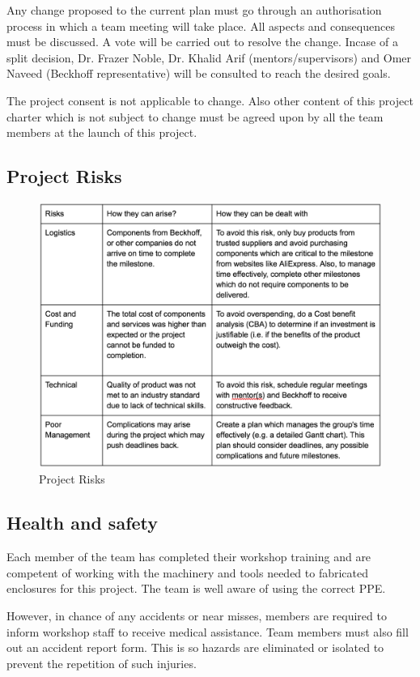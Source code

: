 \documentclass[a4paper, 10pt, conference]{IEEEconf}
\begin{document}
Any change proposed to the current plan must go through an authorisation process in which a team meeting will take place. All aspects and consequences must be discussed. A vote will be carried out to resolve the change. Incase of a split decision, Dr. Frazer Noble, Dr. Khalid Arif (mentors/supervisors) and Omer Naveed (Beckhoff representative) will be consulted to reach the desired goals.

The project consent is not applicable to change. Also other content of this project charter which is not subject to change must be agreed upon by all the team members at the launch of this project. 

\subsection{Project Risks}

\begin{figure}[h!]
  \includegraphics[width=\linewidth]{images/Management}
  \caption{Project Risks}
  \label{fig:ProjectRisks}
\end{figure}

\subsection{Health and safety}
Each member of the team has completed their workshop training and are competent of working with the machinery and tools needed to fabricated enclosures for this project. The team is well aware of using the correct PPE.

However, in chance of any accidents or near misses, members are required to inform workshop staff to receive medical assistance. Team members must also fill out an accident report form. This is so hazards are eliminated or isolated to prevent the repetition of such injuries.
\end{document}
